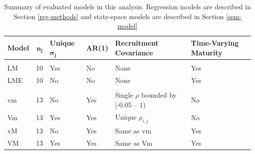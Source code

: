 \documentclass[12pt,]{book}
\theoremstyle{definition}
\theoremstyle{definition}
\theoremstyle{definition}
\theoremstyle{remark}
\begin{document}
\clearpage

\begin{table}

\caption{\label{tab:models-table}Summary of evaluated models in this analysis. Regression models are described in Section \ref{reg-methods} and state-space models are described in Section \ref{ssm-model}}
\centering
\begin{tabular}[t]{lrll>{\raggedright\arraybackslash}p{15em}>{\raggedright\arraybackslash}p{7em}}
\toprule
\textbf{Model} & $\boldsymbol{n_j}$ & \textbf{Unique} $\boldsymbol{\sigma_j}$ & \textbf{AR(1)} & \textbf{Recruitment Covariance} & \textbf{Time-Varying Maturity}\\
\midrule
\addlinespace[0.3em]
\multicolumn{6}{l}{\textbf{Regression-Based Models}}\\
\hline
\hspace{1em}LM & 10 & Yes & No & None & Yes\\
\hspace{1em}LME & 10 & No & No & None & Yes\\
\addlinespace[0.3em]
\multicolumn{6}{l}{\textbf{State-Space Models}}\\
\hline
\hspace{1em}vm & 13 & No & Yes & Single $\rho$ bounded by [-0.05 -- 1) & No\\
\hspace{1em}Vm & 13 & Yes & Yes & Unique $\rho_{i,j}$ & No\\
\hspace{1em}vM & 13 & No & Yes & Same as vm & Yes\\
\hspace{1em}VM & 13 & Yes & Yes & Same as Vm & Yes\\
\bottomrule
\end{tabular}
\end{table}

\clearpage
\end{document}
